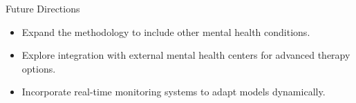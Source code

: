 \documentclass[10pt, xcolor=table]{beamer}
\let\olditem\item
\renewcommand\item{\olditem\justifying}
\begin{document}
\begin{frame}{Future Directions}
	
	\begin{tcolorbox}[width=\textwidth, colback=myNewColorB, colframe=myNewColorA, boxrule=0.7mm, rounded corners]
		\begin{itemize}
			\item Expand the methodology to include other mental health conditions.
			\item Explore integration with external mental health centers for advanced therapy options.
			\item Incorporate real-time monitoring systems to adapt models dynamically.
		\end{itemize}
	\end{tcolorbox}
	
\end{frame}






	
\end{document}
